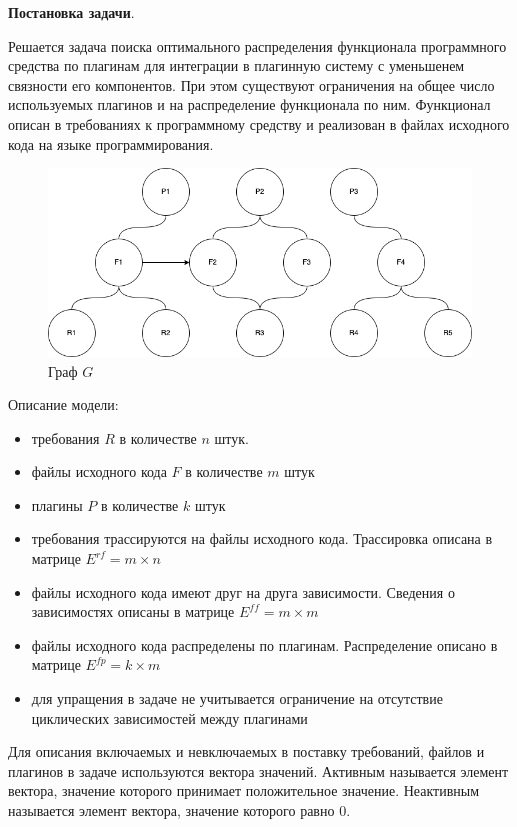 \documentclass{article}
\begin{document}
  \textbf{Постановка задачи}.

  Решается задача поиска оптимального распределения функционала программного средства по плагинам для интеграции в плагинную систему с уменьшенем связности его компонентов. При этом существуют ограничения на общее число используемых плагинов и на распределение функционала по ним. Функционал описан в требованиях к программному средству и реализован в файлах исходного кода на языке программирования.

  \begin{figure}[H]
      \centering
      \includegraphics[width=1\textwidth]{Исходный граф.drawio}
      \caption{Граф $G$}
  \end{figure}

  Описание модели:
  \begin{itemize}
    \item требования $R$ в количестве $n$ штук.
    \item файлы исходного кода $F$ в количестве $m$ штук
    \item плагины $P$ в количестве $k$ штук
    \item требования трассируются на файлы исходного кода. Трассировка описана в матрице $E^{rf} = m \times n$
    \item файлы исходного кода имеют друг на друга зависимости. Сведения о зависимостях описаны в матрице $E^{ff} = m \times m$
    \item файлы исходного кода распределены по плагинам. Распределение описано в матрице $E^{fp} = k \times m$
    \item для упращения в задаче не учитывается ограничение на отсутствие циклических зависимостей между плагинами
  \end{itemize}

  Для описания включаемых и невключаемых в поставку требований, файлов и плагинов в задаче используются вектора значений. Активным называется элемент вектора, значение которого принимает положительное значение. Неактивным называется элемент вектора, значение которого равно $0$.
\end{document}
